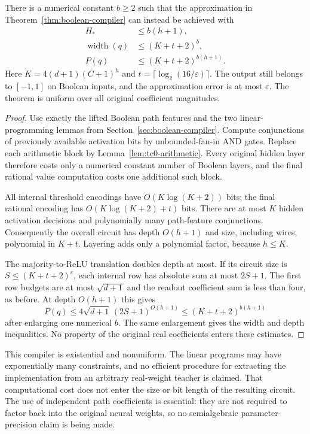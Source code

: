 \begin{theorem}
\label{thm:constant-depth-compiler}
There is a numerical constant $b\ge2$ such that the approximation in Theorem~\ref{thm:boolean-compiler} can instead be achieved with
\begin{align}
 H_*&\le b(h+1),\label{eq:constant-depth-depth}\\
 \operatorname{width}(q)&\le(K+t+2)^b,\label{eq:constant-depth-width}\\
 P(q)&\le(K+t+2)^{b(h+1)}.\label{eq:constant-depth-path}
\end{align}
Here $K=4(d+1)(C+1)^h$ and $t=\lceil\log_2(16/\varepsilon)\rceil$. The output still belongs to $[-1,1]$ on Boolean inputs, and the approximation error is at most $\varepsilon$. The theorem is uniform over all original coefficient magnitudes.
\end{theorem}
\begin{proof}
Use exactly the lifted Boolean path features and the two linear-programming lemmas from Section~\ref{sec:boolean-compiler}. Compute conjunctions of previously available activation bits by unbounded-fan-in AND gates. Replace each arithmetic block by Lemma~\ref{lem:tc0-arithmetic}. Every original hidden layer therefore costs only a numerical constant number of Boolean layers, and the final rational value computation costs one additional such block.

All internal threshold encodings have $O(K\log(K+2))$ bits; the final rational encoding has $O(K\log(K+2)+t)$ bits. There are at most $K$ hidden activation decisions and polynomially many path-feature conjunctions. Consequently the overall circuit has depth $O(h+1)$ and size, including wires, polynomial in $K+t$. Layering adds only a polynomial factor, because $h\le K$.

The majority-to-ReLU translation doubles depth at most. If its circuit size is $S\le(K+t+2)^{c}$, each internal row has absolute sum at most $2S+1$. The first row budgets are at most $\sqrt{d+1}$ and the readout coefficient sum is less than four, as before. At depth $O(h+1)$ this gives
\[
 P(q)\le4\sqrt{d+1}\,(2S+1)^{O(h+1)}
       \le(K+t+2)^{b(h+1)}
\]
after enlarging one numerical $b$. The same enlargement gives the width and depth inequalities. No property of the original real coefficients enters these estimates.
\end{proof}

This compiler is existential and nonuniform. The linear programs may have exponentially many constraints, and no efficient procedure for extracting the implementation from an arbitrary real-weight teacher is claimed. That computational cost does not enter the size or bit length of the resulting circuit. The use of independent path coefficients is essential: they are not required to factor back into the original neural weights, so no semialgebraic parameter-precision claim is being made.
